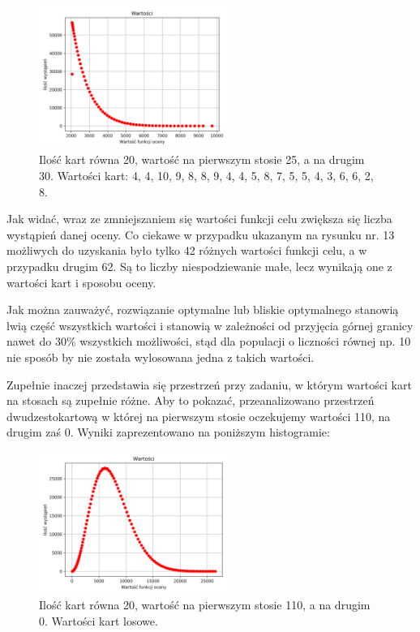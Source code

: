 \documentclass[12pt]{article}
\begin{document}
\newpage

\begin{figure}[h]
	\centering					\includegraphics[width=0.55\textwidth]{2Values.png}
	\caption{Ilość kart równa 20, wartość na pierwszym stosie 25, a na drugim 30. Wartości kart: 4, 4, 10, 9, 8, 8, 9, 4, 4, 5, 8, 7, 5, 5, 4, 3, 6, 6, 2, 8.}
	\label{fig1}
\end{figure}

Jak widać, wraz ze zmniejszaniem się wartości funkcji celu zwiększa się liczba wystąpień danej oceny. Co ciekawe w przypadku ukazanym na rysunku nr. 13 możliwych do uzyskania było tylko 42 różnych wartości funkcji celu, a w przypadku drugim 62. Są to liczby niespodziewanie małe, lecz wynikają one z wartości kart i sposobu oceny.  

Jak można zauważyć, rozwiązanie optymalne lub bliskie optymalnego stanowią lwią część wszystkich wartości i stanowią w zależności od przyjęcia górnej granicy nawet do 30\% wszystkich możliwości, stąd dla populacji o liczności równej np. 10 nie sposób by nie została wylosowana jedna z takich wartości.

Zupełnie inaczej przedstawia się przestrzeń przy zadaniu, w którym wartości kart na stosach są zupełnie różne. Aby to pokazać, przeanalizowano przestrzeń dwudzestokartową w której na pierwszym stosie oczekujemy wartości 110, na drugim zaś 0. Wyniki zaprezentowano na poniższym histogramie:
\begin{figure}[H]
	\centering					\includegraphics[width=0.55\textwidth]{3Values.png}
	\caption{Ilość kart równa 20, wartość na pierwszym stosie 110, a na drugim 0. Wartości kart losowe.}
	\label{fig1}
\end{figure}
\end{document}
